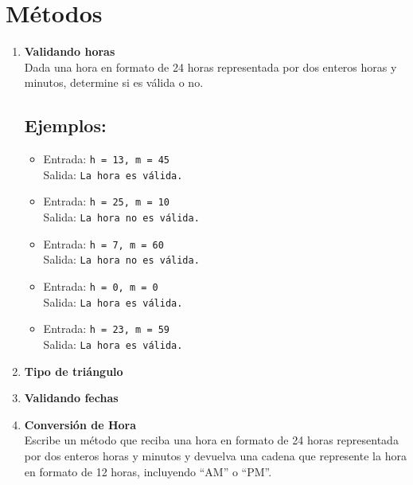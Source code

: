 \section{Métodos}
\begin{enumerate}
    \item \textbf{Validando horas}\\
     Dada una hora en formato de 24 horas representada por dos enteros horas y minutos, determine si es válida o no.
     \subsection*{Ejemplos:}
    \begin{itemize}
        \item Entrada: \texttt{h = 13, m = 45}\\
              Salida: \texttt{La hora es válida.}
        \item Entrada: \texttt{h = 25, m = 10}\\
              Salida: \texttt{La hora no es válida.}
        \item Entrada: \texttt{h = 7, m = 60}\\
              Salida: \texttt{La hora no es válida.}
        \item Entrada: \texttt{h = 0, m = 0}\\
              Salida: \texttt{La hora es válida.}
        \item Entrada: \texttt{h = 23, m = 59}\\
              Salida: \texttt{La hora es válida.}
    \end{itemize}

     \item \textbf{Tipo de triángulo}\\
    

    \item \textbf{Validando fechas}\\
    
    
    \item \textbf{Conversión de Hora} \\
    Escribe un método que reciba una hora en formato de 24 horas representada por dos enteros horas y minutos y devuelva una cadena que represente la hora en formato de 12 horas, incluyendo ``AM'' o ``PM''.

\end{enumerate}
